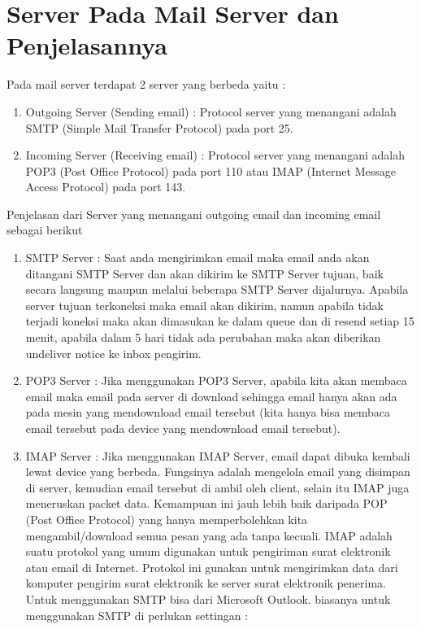 \section {Server Pada Mail Server dan Penjelasannya} 
Pada mail server terdapat 2 server yang berbeda yaitu :  
\begin{enumerate}
\item Outgoing Server (Sending email) : Protocol server yang menangani adalah SMTP (Simple Mail Transfer Protocol) pada port 25. 
\item Incoming Server (Receiving email) : Protocol server yang menangani adalah POP3 (Post Office Protocol) pada port 110 atau IMAP (Internet Message Access Protocol) pada port 143.
 \end{enumerate}
Penjelasan dari Server yang menangani outgoing email dan incoming email sebagai berikut 
\begin{enumerate}
\item SMTP Server : Saat anda mengirimkan email maka email anda akan ditangani SMTP Server dan akan dikirim ke SMTP Server tujuan, baik secara langsung maupun melalui beberapa SMTP Server dijalurnya. Apabila server tujuan terkoneksi maka email akan dikirim, namun apabila tidak terjadi koneksi maka akan dimasukan ke dalam queue dan di resend setiap 15 menit, apabila dalam 5 hari tidak ada perubahan maka akan diberikan undeliver notice ke inbox pengirim. 
\item POP3 Server : Jika menggunakan POP3 Server, apabila kita akan membaca email maka email pada server di download sehingga email hanya akan ada pada mesin yang mendownload email tersebut (kita hanya bisa membaca email tersebut pada device yang mendownload email tersebut). 
\item IMAP Server : Jika menggunakan IMAP Server, email dapat dibuka kembali lewat device yang berbeda. Fungsinya adalah mengelola email yang disimpan di server, kemudian email tersebut di ambil oleh client, selain itu IMAP juga meneruskan packet data. Kemampuan ini jauh lebih baik daripada POP (Post Office Protocol) yang hanya memperbolehkan kita mengambil/download semua pesan yang ada tanpa kecuali. IMAP adalah suatu  protokol yang umum digunakan untuk pengiriman surat elektronik atau email di Internet. Protokol ini gunakan untuk mengirimkan data dari komputer pengirim surat elektronik ke server surat elektronik penerima. Untuk menggunakan SMTP bisa dari Microsoft Outlook. biasanya untuk menggunakan SMTP di perlukan settingan :
\end{enumerate} 
